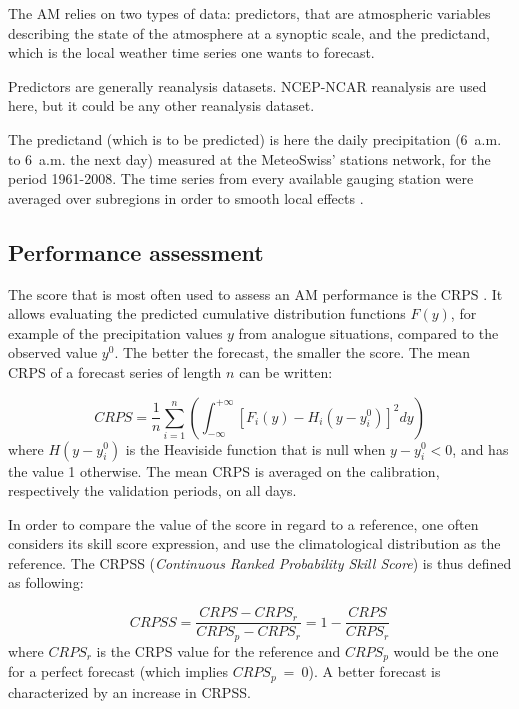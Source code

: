 \documentclass[5p]{elsarticle}
\begin{document}
The AM relies on two types of data: predictors, that are atmospheric variables describing the state of the atmosphere at a synoptic scale, and the predictand, which is the local weather time series one wants to forecast.

Predictors are generally reanalysis datasets. NCEP-NCAR reanalysis \citep[6-hourly, 17 pressure levels at a resolution of 2.5\degree, see][]{Kalnay1996} are used here, but it could be any other reanalysis dataset.

The predictand (which is to be predicted) is here the daily precipitation (6~a.m. to 6~a.m. the next day) measured at the MeteoSwiss' stations network, for the period 1961-2008. The time series from every available gauging station were averaged over subregions in order to smooth local effects \citep{Obled2002, Marty2012}.


\subsection{Performance assessment}
\label{sec:score}

The score that is most often used to assess an AM performance is the CRPS \citep[Continuous Ranked Probability Score,][]{Brown1974, Matheson1976, Hersbach2000}. It allows evaluating the predicted cumulative distribution functions $F(y)$, for example of the precipitation values $y$ from analogue situations, compared to the observed value $y^{0}$. The better the forecast, the smaller the score. The mean CRPS of a forecast series of length $n$ can be written:

\begin{equation}
\label{eq:CRPS}
CRPS = \frac{1}{n} \sum_{i=1}^{n} \left(  \int_{-\infty}^{+\infty} \left[ F_{i}(y)-H_{i}(y-y_{i}^{0})\right]^{2} dy \right) 
\end{equation}
where $H(y-y_{i}^{0})$ is the Heaviside function that is null when $y-y_{i}^{0}<0$, and has the value 1 otherwise. The mean CRPS is averaged on the calibration, respectively the validation periods, on all days.

In order to compare the value of the score in regard to a reference, one often considers its skill score expression, and use the climatological distribution as the reference. The CRPSS (\textit{Continuous Ranked Probability Skill Score}) is thus defined as following:

\begin{equation}
\label{eq:CRPSS}
CRPSS = \frac{CRPS-CRPS_{r}}{CRPS_{p}-CRPS_{r}} = 1-\frac{CRPS}{CRPS_{r}}
\end{equation}
where $CRPS_{r}$ is the CRPS value for the reference and $CRPS_{p}$ would be the one for a perfect forecast (which implies $CRPS_{p}~=~0$). A better forecast is characterized by an increase in CRPSS.
\end{document}
